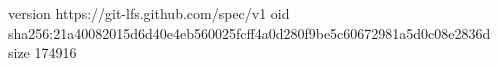 version https://git-lfs.github.com/spec/v1
oid sha256:21a40082015d6d40e4eb560025fcff4a0d280f9be5c60672981a5d0c08e2836d
size 174916

